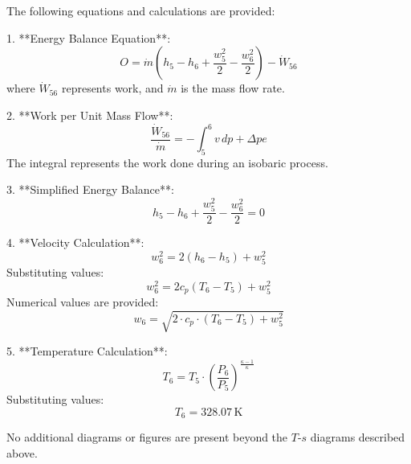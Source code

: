 The following equations and calculations are provided:  

1. **Energy Balance Equation**:  
   \[
   O = \dot{m} \left( h_5 - h_6 + \frac{w_5^2}{2} - \frac{w_6^2}{2} \right) - \dot{W}_{56}
   \]  
   where \( \dot{W}_{56} \) represents work, and \( \dot{m} \) is the mass flow rate.  

2. **Work per Unit Mass Flow**:  
   \[
   \frac{\dot{W}_{56}}{\dot{m}} = - \int_5^6 v \, dp + \Delta pe
   \]  
   The integral represents the work done during an isobaric process.  

3. **Simplified Energy Balance**:  
   \[
   h_5 - h_6 + \frac{w_5^2}{2} - \frac{w_6^2}{2} = 0
   \]  

4. **Velocity Calculation**:  
   \[
   w_6^2 = 2 \left( h_6 - h_5 \right) + w_5^2
   \]  
   Substituting values:  
   \[
   w_6^2 = 2 c_p \left( T_6 - T_5 \right) + w_5^2
   \]  
   Numerical values are provided:  
   \[
   w_6 = \sqrt{2 \cdot c_p \cdot (T_6 - T_5) + w_5^2}
   \]  

5. **Temperature Calculation**:  
   \[
   T_6 = T_5 \cdot \left( \frac{P_6}{P_5} \right)^{\frac{\kappa - 1}{\kappa}}
   \]  
   Substituting values:  
   \[
   T_6 = 328.07 \, \text{K}
   \]  

No additional diagrams or figures are present beyond the \( T \)-\( s \) diagrams described above.